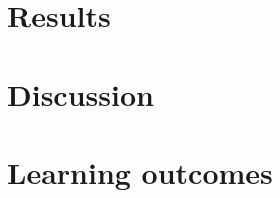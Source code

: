 \documentclass[12pt,fleqn,]{article}
\begin{document}
\section{Results}



\begin{multicols}{2}
	
	\section{Discussion}
	

	
	\section{Learning outcomes} 
	
\end{multicols}

\newpage
\begin{thebibliography}{9}
	

	
	
	

\end{thebibliography}
\end{document}
